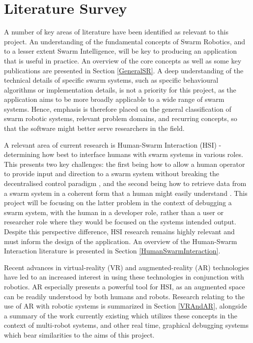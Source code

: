 \documentclass[titlepage,hidelinks,10pt]{article}
\begin{document}
\section{Literature Survey} \label{LitSurvey}
A number of key areas of literature have been identified as relevant to this project. An understanding of the fundamental concepts of Swarm Robotics, and to a lesser extent Swarm Intelligence, will be key to producing an application that is useful in practice. An overview of the core concepts as well as some key publications are presented in Section \ref{GeneralSR}. A deep understanding of the technical details of specific swarm systems, such as specific behavioural algorithms or implementation details, is not a priority for this project, as the application aims to be more broadly applicable to a wide range of swarm systems. Hence, emphasis is therefore placed on the general classification of swarm robotic systems, relevant problem domains, and recurring concepts, so that the software might better serve researchers in the field.

A relevant area of current research is Human-Swarm Interaction (HSI) - determining how best to interface humans with swarm systems in various roles. This presents two key challenges: the first being how to allow a human operator to provide input and direction to a swarm system without breaking the decentralised control paradigm \cite{HumanSwarmInteractionSurvey}, and the second being how to retrieve data from a swarm system in a coherent form that a human might easily understand \cite{DesginingInterfaces}. This project will be focusing on the latter problem in the context of debugging a swarm system, with the human in a developer role, rather than a user or researcher role where they would be focused on the systems intended output. Despite this perspective difference, HSI research remains highly relevant and must inform the design of the application. An overview of the Human-Swarm Interaction literature is presented in Section \ref{HumanSwarmInteraction}.

Recent advances in virtual-reality (VR) and augmented-reality (AR) technologies have led to an increased interest in using these technologies in conjunction with robotics. AR especially presents a powerful tool for HSI, as an augmented space can be readily understood by both humans and robots. Research relating to the use of AR with robotic systems is summarized in Section \ref{VRAndAR}, alongside a summary of the work currently existing which utilizes these concepts in the context of multi-robot systems, and other real time, graphical debugging systems which bear similarities to the aims of this project.
\end{document}
